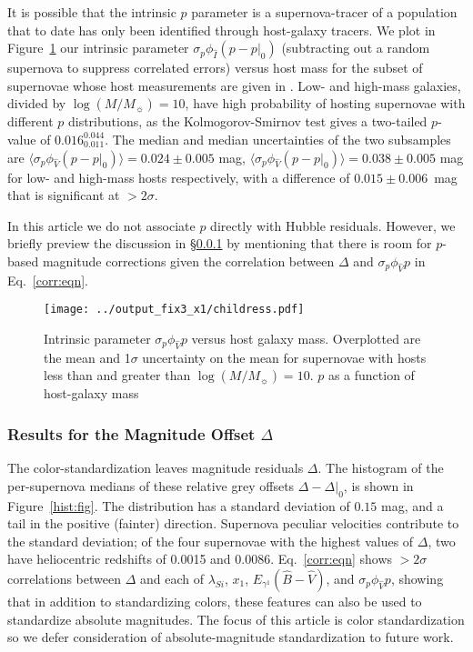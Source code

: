 \documentclass[trackchanges]{aastex61}   	%
\begin{document}
{It is possible that the intrinsic $p$ parameter is a supernova-tracer of a population that to date has only been identified through host-galaxy tracers.
We plot in Figure~\ref{childress3:fig} our intrinsic parameter
 $\sigma_p\phi_{\hat{I}}(p-p|_0) $  (subtracting out a random supernova
to suppress correlated errors) versus host mass
for the subset of supernovae whose host measurements are given in \citet{2013ApJ...770..108C}.
Low- and high-mass galaxies, divided by $\log{(M/M_\sun)}=10$, have high probability of hosting supernovae with different $p$ distributions, as
the Kolmogorov-Smirnov test gives a two-tailed $p$-value of $  0.016 _ {     0.011 } ^{     0.044 }$. %
The median and median uncertainties of the two subsamples are
$\langle \sigma_p\phi_{\hat{V}}(p-p|_0) \rangle=  0.024 \pm {     0.005 }$ mag, %
$\langle \sigma_p\phi_{\hat{V}}(p-p|_0)  \rangle=0.038 \pm {     0.005 }$ mag
for low- and high-mass hosts respectively, with a difference of $ 0.015 \pm {     0.006 }$~mag that is significant at $>2 \sigma$.

In this article we do not associate $p$ directly with Hubble residuals.  However,
we briefly  preview the discussion in \S\ref{Delta:sec} by mentioning that there is room for $p$-based magnitude corrections
given the correlation between $\Delta$ and $\sigma_p\phi_{\hat{V}}p$ in Eq.~\ref{corr:eqn}.

\begin{figure}[htbp] %
   \centering
   \texttt{[image: ../output\_fix3\_x1/childress.pdf]} 
   \caption{Intrinsic parameter $\sigma_p\phi_{\hat{V}}p$  versus host galaxy mass. Overplotted are the mean and 1$\sigma$ uncertainty on the mean for supernovae with hosts
      less than and greater than  $\log{(M/M_\sun)}=10$.
 $p$ as a function of host-galaxy mass
    \label{childress3:fig}}
\end{figure}


\subsubsection{Results for the Magnitude Offset $\Delta$}
\label{Delta:sec}

The color-standardization leaves magnitude residuals $\Delta$.
The histogram of the per-supernova  medians of these relative  grey offsets $\Delta-\Delta|_0$,
is shown in Figure~\ref{hist:fig}.  The distribution
has a standard deviation of
$0.15$
mag, and a tail in the positive (fainter) direction.
Supernova peculiar velocities contribute to the standard deviation; of the four
supernovae with the highest values of $\Delta$, two have 
heliocentric
redshifts of 0.0015 and 0.0086. 
Eq.~\ref{corr:eqn} shows $>2 \sigma$ correlations between $\Delta$ and each of $\lambda_{Si}$, $x_1$, $E_{\gamma^1}({\hat{B}}-{\hat{V}})$, and
$\sigma_p\phi_{\hat{V}}p$, showing that in addition to standardizing colors, these features can also be used to standardize
absolute magnitudes.   
The focus of this article is color standardization so we defer consideration of absolute-magnitude standardization to future work.
 
}
\end{document}
